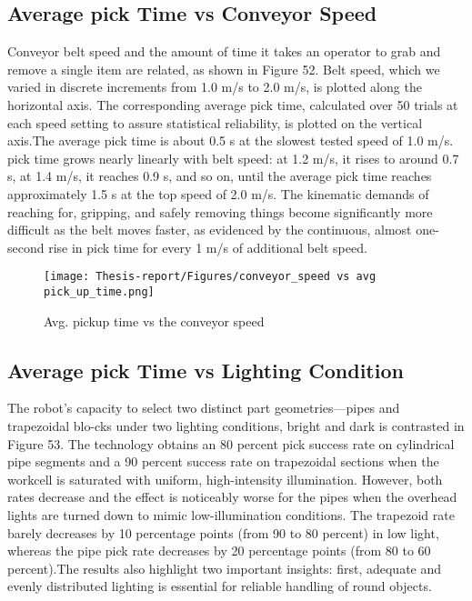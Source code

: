 \documentclass[12pt]{article}
\begin{document}
\subsection{Average pick Time vs Conveyor Speed}
Conveyor belt speed and the amount of time it takes an operator to grab and remove a single item are related, as shown in Figure 52.  Belt speed, which we varied in discrete increments from 1.0 m/s to 2.0 m/s, is plotted along the horizontal axis. The corresponding average pick time, calculated over 50 trials at each speed setting to assure statistical reliability, is plotted on the vertical axis.The average pick time is about 0.5 s at the slowest tested speed of 1.0 m/s.  pick time grows nearly linearly with belt speed: at 1.2 m/s, it rises to around 0.7 s, at 1.4 m/s, it reaches 0.9 s, and so on, until the average pick time reaches approximately 1.5 s at the top speed of 2.0 m/s.  The kinematic demands of reaching for, gripping, and safely removing things become significantly more difficult as the belt moves faster, as evidenced by the continuous, almost one-second rise in pick time for every 1 m/s of additional belt speed.

\begin{figure}[h]
    \centering
    \texttt{[image: Thesis-report/Figures/conveyor\_speed vs avg pick\_up\_time.png]}
    \caption{Avg. pickup time vs the conveyor speed \cite{ref22}}
    \label{fig1.Photoneo Cmaera}
\end{figure}


\subsection{Average pick Time vs Lighting Condition}
The robot's capacity to select two distinct part geometries—pipes and trapezoidal blo-cks under two lighting conditions, bright and dark is contrasted in Figure 53.  The technology obtains an 80 percent pick success rate on cylindrical pipe segments and a 90 percent success rate on trapezoidal sections when the workcell is saturated with uniform, high-intensity illumination.  However, both rates decrease and the effect is noticeably worse for the pipes when the overhead lights are turned down to mimic low-illumination conditions. The trapezoid rate barely decreases by 10 percentage points (from 90 to 80 percent) in low light, whereas the pipe pick rate decreases by 20 percentage points (from 80 to 60 percent).The results also highlight two important insights: first, adequate and evenly distributed lighting is essential for reliable handling of round objects.
\end{document}
